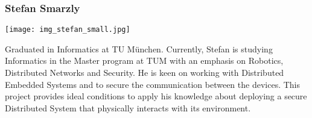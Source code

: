 \subsubsection*{Stefan Smarzly}
%
\begin{minipage}{0.2\textwidth}
\begin{flushleft}
	\texttt{[image: img\_stefan\_small.jpg]}
\end{flushleft}
\end{minipage}
\hfill
\begin{minipage}{0.8\textwidth}
%
Graduated in Informatics at TU München. Currently, Stefan is studying Informatics in the Master program at TUM with an emphasis on Robotics, Distributed Networks and Security.
He is keen on working with Distributed Embedded Systems and to secure the communication between the devices.
This project provides ideal conditions to apply his knowledge about deploying a secure Distributed System that physically interacts with its environment.
%
\end{minipage}